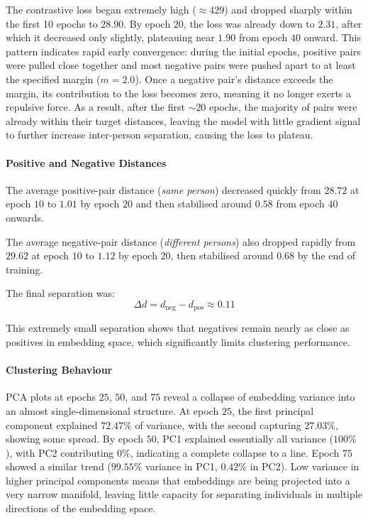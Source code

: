 The contrastive loss began extremely high ($\approx 429$) and dropped sharply
within the first 10 epochs to $28.90$. By epoch $20$, the loss was already down
to $2.31$, after which it decreased only slightly, plateauing near $1.90$ from
epoch $40$ onward. This pattern indicates rapid early convergence: during the
initial epochs, positive pairs were pulled close together and most negative
pairs were pushed apart to at least the specified margin ($m = 2.0$). Once a
negative pair's distance exceeds the margin, its contribution to the loss
becomes zero, meaning it no longer exerts a repulsive force. As a result, after
the first $\sim 20$ epochs, the majority of pairs were already within their
target distances, leaving the model with little gradient signal to further
increase inter-person separation, causing the loss to plateau.

\paragraph{Positive and Negative Distances}

The average positive-pair distance (\textit{same person}) decreased quickly
from $28.72$ at epoch $10$ to $1.01$ by epoch $20$ and then stabilised around
$0.58$ from epoch $40$ onwards.

The average negative-pair distance (\textit{different persons}) also dropped
rapidly from $29.62$ at epoch $10$ to $1.12$ by epoch $20$, then stabilised
around $0.68$ by the end of training.

The final separation was:
\[
\Delta d = d_{\mathrm{neg}} - d_{\mathrm{pos}} \approx 0.11
\]

This extremely small separation shows that negatives remain nearly as close as
positives in embedding space, which significantly limits clustering
performance.

\paragraph{Clustering Behaviour}

PCA plots at epochs $25$, $50$, and $75$ reveal a collapse of embedding
variance into an almost single-dimensional structure. At epoch $25$, the first
principal component explained $72.47\%$ of variance, with the second capturing
$27.03\%$, showing some spread. By epoch $50$, PC1 explained essentially all
variance ($100\%$), with PC2 contributing $0\%$, indicating a complete collapse
to a line. Epoch $75$ showed a similar trend ($99.55\%$ variance in PC1,
$0.42\%$ in PC2).
Low variance in higher principal components means that embeddings are being
projected into a very narrow manifold, leaving little capacity for separating
individuals in multiple directions of the embedding space.

